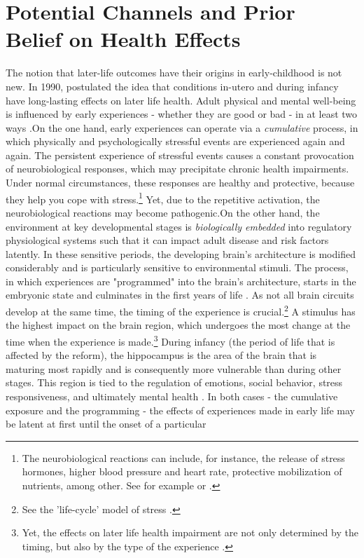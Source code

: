 \documentclass[11pt, a4paper]{article} %
\begin{document}
 





\section[Channels]{Potential Channels and Prior Belief on Health Effects}\label{sec:channels}
The notion that later-life outcomes have their origins in early-childhood is not new. In 1990, \citeauthor{Barker1990origins} postulated the idea that conditions in-utero and during infancy have long-lasting effects on later life health. Adult physical and mental well-being is influenced by early experiences - whether they are good or bad - in at least two ways \citep{shonkoff2009neuroscience}.\newline On the one hand, early experiences can operate via a \emph{cumulative} process, in which physically and psychologically stressful events are experienced again and again. The persistent experience of stressful events causes a constant provocation of neurobiological responses, which may precipitate chronic health impairments. Under normal circumstances, these responses are healthy and protective, because they help you cope with stress.\footnote{The neurobiological reactions can include, for instance, the release of stress hormones, higher blood pressure and heart rate, protective mobilization of nutrients, among other. See for example \cite{mcewen1998stress} or \cite{shonkoff2009neuroscience}.} Yet, due to the repetitive activation, the neurobiological reactions may become pathogenic.\newline On the other hand, the environment at key developmental stages is \emph{biologically embedded} into regulatory physiological systems such that it can impact adult disease and risk factors latently. In these sensitive periods, the developing brain's architecture is modified considerably and is particularly sensitive to environmental stimuli. The process, in which experiences are "programmed" into the brain's architecture, starts in the embryonic state and culminates in the first years of life \citep{raikkonen2012early}. As not all brain circuits develop at the same time, the timing of the experience is crucial.\footnote{See the 'life-cycle' model of stress \citep{lupien2009effects}.} A stimulus has the highest impact on the brain region, which undergoes the most change at the time when the experience is made.\footnote{Yet, the effects on later life health impairment are not only determined by the timing, but also by the type of the experience \citep{raikkonen2012early}.} During infancy (the period of life that is affected by the reform), the hippocampus is the area of the brain that is maturing most rapidly and is consequently more vulnerable than during other stages. This region is tied to the regulation of emotions, social behavior, stress responsiveness, and ultimately mental health \citep{center2016best,shonkoff2009neuroscience}. \newline In both cases - the cumulative exposure and the programming - the effects of experiences made in early life may be latent at first until the onset of a particular 
\end{document}
